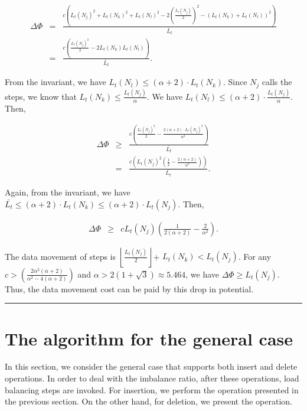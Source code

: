 \documentclass[a4paper]{article}
\newenvironment{proof}{{\bf Proof:}}{\hfill\rule{1.5mm}{3mm}\vspace{0.1in}}
\begin{document}
\begin{proof}
  \begin{eqnarray*}
    \Delta\Phi&=& \frac{c\left(L_t(N_j)^2+L_t(N_k)^2+L_t(N_l)^2
        -2(\frac{L_t(N_j)}{2})^2-(L_t(N_k)+L_t(N_l))^2\right)}{\bar{L}_t}\\
    &=&\frac{c\left(\frac{L_t(N_j)^2}{2}-2L_t(N_k)L_t(N_l)\right)}{\bar{L}_t}.
  \end{eqnarray*}	

  From the invariant, we have $L_t(N_l)\leq(\alpha+2)\cdot L_t(N_k)$.
  Since $N_j$ calls the  {\minbalance} steps, we know that
  $L_t(N_k)\leq \frac{L_t(N_j)}{\alpha}$. We have  $L_t(N_l)\leq (\alpha+2)\cdot
  \frac{L_t(N_j)}{\alpha}$.  Then, 

  \begin{eqnarray*}
    \Delta\Phi & \geq &
    \frac{c\left(\frac{L_t(N_j)^2}{2}-\frac{2(\alpha+2)\cdot
          L_t(N_j)^2}{\alpha^2}\right)}{\bar{L_t}}\\ & = &
    \frac{c\left(L_t(N_j)^2(\frac{1}{2} - \frac{2(\alpha+2)
        }{\alpha^2})\right)}{\bar{L_t}}.
  \end{eqnarray*}

  Again, from the invariant, we have $ \bar{L_t}\leq(\alpha+2)\cdot
  L_t(N_k)\leq(\alpha+2)\cdot L_t(N_j)$.  Then,

  \begin{eqnarray*}
    \Delta\Phi&\geq& c L_t(N_j)\left(\frac{1}{2(\alpha+2)} -
      \frac{2}{\alpha^2}\right).
  \end{eqnarray*}

  The data movement of {\minbalance} steps is $\left\lfloor
    \frac{L_t(N_j)}{2} \right\rfloor$+ $L_t(N_k)<L_t(N_j)$.  For any $c
  >\left(\frac{2\alpha^2(\alpha+2)}{\alpha^2-4(\alpha+2)}\right)$ and $\alpha>2(1+\sqrt{3})\approx 5.464$, we
  have $\Delta\Phi\geq L_t(N_j)$.  Thus, the data movement cost can be
  paid by this drop in potential.
\end{proof}


\section{The algorithm for the general case}
\label{sect:algorithm-delete}

In this section, we consider the general case that supports both insert and delete
operations. In order to deal with the imbalance ratio, after these operations,
load balancing steps are invoked. For insertion, we perform the
{\minbalance} operation presented in the previous section. On the other
hand, for deletion, we present the {\split} operation.
\end{document}
